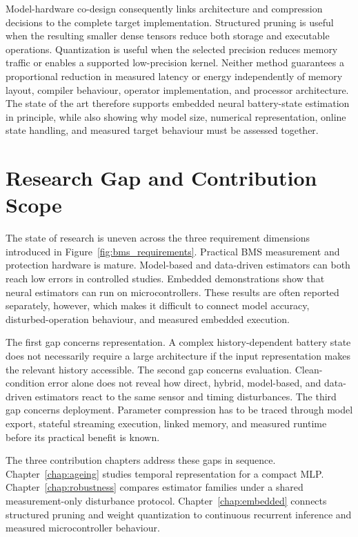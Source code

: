 \documentclass[
    a4paper,
    12pt,
    titlepage,
    bibliography=totoc,
    twoside=on,
    parskip=false,
    numbers=noenddot,
    cleardoublepage=empty,
    DIV=12,
    BCOR=12.0mm,
    headheight=36pt,
    headings=openright
]{scrreprt}
\begin{document}
Model-hardware co-design consequently links architecture and compression decisions to the complete target implementation. Structured pruning is useful when the resulting smaller dense tensors reduce both storage and executable operations. Quantization is useful when the selected precision reduces memory traffic or enables a supported low-precision kernel. Neither method guarantees a proportional reduction in measured latency or energy independently of memory layout, compiler behaviour, operator implementation, and processor architecture. The state of the art therefore supports embedded neural battery-state estimation in principle, while also showing why model size, numerical representation, online state handling, and measured target behaviour must be assessed together.\autocite{hanLearningBothWeights2015,jacobQuantizationTrainingNeural2017,schulzePQBenchBenchmarking2025,abushahlaNeuralNetworkQuantization2026}

\section{Research Gap and Contribution Scope}
The state of research is uneven across the three requirement dimensions introduced in Figure~\ref{fig:bms_requirements}. Practical BMS measurement and protection hardware is mature. Model-based and data-driven estimators can both reach low errors in controlled studies. Embedded demonstrations show that neural estimators can run on microcontrollers. These results are often reported separately, however, which makes it difficult to connect model accuracy, disturbed-operation behaviour, and measured embedded execution.

The first gap concerns representation. A complex history-dependent battery state does not necessarily require a large architecture if the input representation makes the relevant history accessible. The second gap concerns evaluation. Clean-condition error alone does not reveal how direct, hybrid, model-based, and data-driven estimators react to the same sensor and timing disturbances. The third gap concerns deployment. Parameter compression has to be traced through model export, stateful streaming execution, linked memory, and measured runtime before its practical benefit is known.

The three contribution chapters address these gaps in sequence. Chapter~\ref{chap:ageing} studies temporal representation for a compact MLP. Chapter~\ref{chap:robustness} compares estimator families under a shared measurement-only disturbance protocol. Chapter~\ref{chap:embedded} connects structured pruning and weight quantization to continuous recurrent inference and measured microcontroller behaviour.
\end{document}
